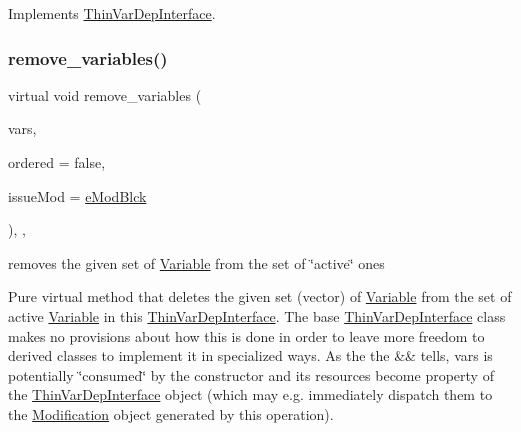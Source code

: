 Implements \mbox{\hyperlink{group___thin_var_dep_interface___c_l_a_s_s_e_s_gad6726141a0cbe6a0410a2b396809dade}{Thin\+Var\+Dep\+Interface}}.

\mbox{\label{class_s_m_spp__di__unipi__it_1_1_f_row_constraint_a46c11bb15648f9976eee469c53099b11}} 
\subsubsection{\texorpdfstring{remove\+\_\+variables()}{remove\_variables()}}
{\footnotesize\ttfamily virtual void remove\+\_\+variables (\begin{DoxyParamCaption}\item[{std\+::vector$<$ \mbox{\hyperlink{class_s_m_spp__di__unipi__it_1_1_variable}{Variable}} $\ast$$>$ \&\&}]{vars,  }\item[{const bool}]{ordered = {\ttfamily false},  }\item[{\mbox{\hyperlink{group___modification___t_y_p_e_s_ga544246d8c462e9a2d817c2c30797968f}{c\+\_\+\+Mod\+Param}}}]{issue\+Mod = {\ttfamily \mbox{\hyperlink{group___modification___t_y_p_e_s_gga48fddcdd03a03f49b7e389ca1ed938d4a21b14b26b1c0093a0905f6fc010bad29}{e\+Mod\+Blck}}} }\end{DoxyParamCaption})\hspace{0.3cm}{\ttfamily [inline]}, {\ttfamily [override]}, {\ttfamily [virtual]}}



removes the given set of \mbox{\hyperlink{class_s_m_spp__di__unipi__it_1_1_variable}{Variable}} from the set of \char`\"{}active\char`\"{} ones 

Pure virtual method that deletes the given set (vector) of \mbox{\hyperlink{class_s_m_spp__di__unipi__it_1_1_variable}{Variable}} from the set of active \mbox{\hyperlink{class_s_m_spp__di__unipi__it_1_1_variable}{Variable}} in this \mbox{\hyperlink{class_s_m_spp__di__unipi__it_1_1_thin_var_dep_interface}{Thin\+Var\+Dep\+Interface}}. The base \mbox{\hyperlink{class_s_m_spp__di__unipi__it_1_1_thin_var_dep_interface}{Thin\+Var\+Dep\+Interface}} class makes no provisions about how this is done in order to leave more freedom to derived classes to implement it in specialized ways. As the the \&\& tells, vars is potentially \char`\"{}consumed\char`\"{} by the constructor and its resources become property of the \mbox{\hyperlink{class_s_m_spp__di__unipi__it_1_1_thin_var_dep_interface}{Thin\+Var\+Dep\+Interface}} object (which may e.\+g. immediately dispatch them to the \mbox{\hyperlink{class_s_m_spp__di__unipi__it_1_1_modification}{Modification}} object generated by this operation).

